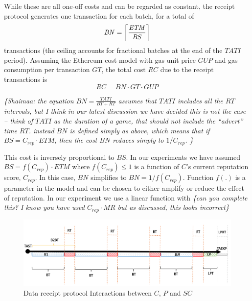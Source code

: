 \documentclass[letterpaper, 10 pt, conference]{ieeeconf}  %
\DeclarePairedDelimiter{\ceil}{\lceil}{\rceil}
\newcommand{\mynote}[1]{{\leavevmode\smaller\itshape\color{red}\{#1\}}}
\newcommand{\anote}[1]{{\leavevmode\smaller\itshape\color{red}\{#1\}}}
\newcommand{\bs}{\ensuremath{\mathit{BS}}}
\newcommand{\mr}{\ensuremath{\mathit{MR}}}
\newcommand{\tati}{\ensuremath{\mathit{TATI}}}
\newcommand{\etm}{\ensuremath{\mathit{ETM}}}
\newcommand{\bn}{\ensuremath{\mathit{BN}}}
\newcommand{\smartc}{\ensuremath{\mathit{SC}}}
\newcommand{\rt}{\ensuremath{\mathit{RT}}}
\newcommand{\bt}{\ensuremath{\mathit{BT}}}
\newcommand{\crep}{\ensuremath{C_{\mathit{rep}} }}
\newcommand{\gt}{\ensuremath{\mathit{GT}}}
\newcommand{\rc}{\ensuremath{\mathit{RC}}}   %
\newcommand{\gup}{\ensuremath{\mathit{GUP}}}
\begin{document}
While these are all one-off costs and can be regarded as constant, the receipt protocol generates one transaction for each batch, for a total of 
\[\bn = \ceil[\bigg] {\frac{\etm}{\bs}} \]
transactions (the ceiling accounts for fractional batches at the end of the \tati{} period). 
Assuming the Ethereum cost model with gas unit price \gup{} and gas consumption per transaction \gt, the total cost \rc{} due to the receipt transactions is 
\[\rc = \bn \cdot  \gt \cdot \gup    \]

\mynote{Shaimaa:  the equation $\bn=\frac{\tati}{\bt+\rt}$ assumes that \tati{} includes all the \rt{} intervals, but I think in our latest discussion we have decided this is not the case -- think of \tati{} as the duration of a game, that should not include the ``advert'' time \rt{}. instead \bn{} is defined simply as above, which means that if $\bs=C_{rep} \cdot \etm$, then the cost \bn{} reduces simply to $1/C_{rep}$.
}

This cost is inversely proportional to \bs{}. In our experiments we have assumed $\bs= f(\crep) \cdot \etm$ where   $f(\crep{}) \leq 1$ is a function of $C$'s current reputation score, \crep.
In this case, \bn{} simplifies to $\bn =  1/f(\crep{})$.
Function $f(.)$ is a parameter in the model and can be chosen to either amplify or reduce the effect of reputation. In our experiment we use a linear function with \mynote{can you complete this?  I know you have used $\crep \cdot \mr$ but as discussed, this looks incorrect}

\begin{figure}
	\caption{Data receipt protocol Interactions between $C$, $P$ and \smartc{}}
	\label{fig:batching}
	\includegraphics[width=.7\textwidth]{Dis}
	\centering
\end{figure}



\end{document}
